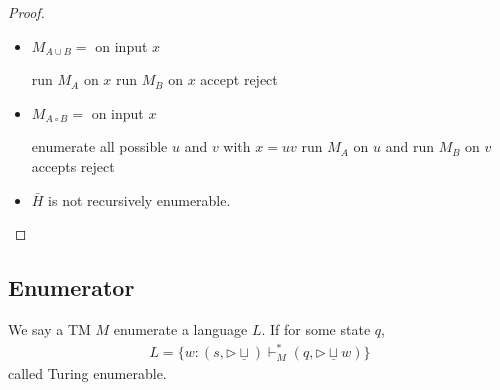 \begin{proof}\quad

    \begin{itemize}
        \item $M_{A\cup B}=$ on input $x$
        \begin{algorithm}[H]
            \caption{$M_{A\cup B}$}
            \begin{algorithmic}
                \State run $M_A$ on $x$
                \State run $M_B$ on $x$
                    accept
                \Else
                    \quad reject
                \EndIf
            \end{algorithmic}
        \end{algorithm}
        \item $M_{A\circ B}=$ on input $x$
        \begin{algorithm}[H]
            \caption{$M_{A\circ B}$}
            \begin{algorithmic}
                \State enumerate all possible $u$ and $v$ with $x=uv$
                \State run $M_A$ on $u$ and run $M_B$ on $v$
                    accepts
                \Else
                    \quad reject
                \EndIf
            \end{algorithmic}
        \end{algorithm}
        
        \item $\bar{H}$ is not recursively enumerable. 
    \end{itemize}
\end{proof}

\subsection{Enumerator}

\begin{definition}
    We say a TM $M$ enumerate a language $L$. If for some state $q$, 
    \begin{align*}
        L=\{ w: (s,\triangleright \underline{\sqcup})\vdash_M^*(q,\triangleright \underline{\sqcup} w) \}
    \end{align*}
    called Turing enumerable. 
\end{definition}

